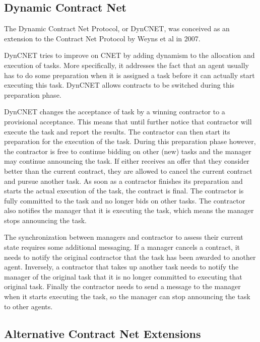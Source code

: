 \documentclass[10pt,a4paper]{article}
\makeatletter
\newcommand{\taskV}[1]{\todo[inline, color=red]{@Victor, fix: #1}}
\makeatother
\begin{document}
\subsection{Dynamic Contract Net}
The Dynamic Contract Net Protocol, or DynCNET, was conceived as an extension to the Contract Net Protocol by Weyns et al in 2007. \cite{DynCNET}

DynCNET tries to improve on CNET by adding dynamism to the allocation and execution of tasks. More specifically, it addresses the fact that an agent usually has to do some preparation when it is assigned a task before it can actually start executing this task. DynCNET allows contracts to be switched during this preparation phase.

DynCNET changes the acceptance of task by a winning contractor to a provisional acceptance. This means that until further notice that contractor will execute the task and report the results. The contractor can then start its preparation for the execution of the task. During this preparation phase however, the contractor is free to continue bidding on other (new) tasks and the manager may continue announcing the task. If either receives an offer that they consider better than the current contract, they are allowed to cancel the current contract and pursue another task. As soon as a contractor finishes its preparation and starts the actual execution of the task, the contract is final. The contractor is fully committed to the task and no longer bids on other tasks. The contractor also notifies the manager that it is executing the task, which means the manager stops announcing the task.

The synchronization between managers and contractor to assess their current state requires some additional messaging. If a manager cancels a contract, it needs to notify the original contractor that the task has been awarded to another agent. Inversely, a contractor that takes up another task needs to notify the manager of the original task that it is no longer committed to executing that original task. Finally the contractor needs to send a message to the manager when it starts executing the task, so the manager can stop announcing the task to other agents.

\subsection{Alternative Contract Net Extensions}
\taskV{nalezen}
\end{document}
